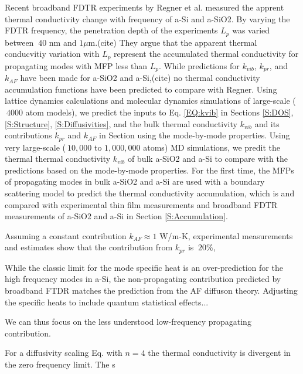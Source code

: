 \documentclass[aps,prb,twocolumn,superscriptaddress,footinbib,amsmath,amssymb,floatfix]{revtex4}
\begin{document}
Recent broadband FDTR experiments by Regner et al. measured  
the apprent thermal conductivity change with frequency of a-Si and 
a-SiO2. By varying the FDTR frequency, 
the penetration depth of the experiments $L_p$ was varied 
between $~40$ nm and $1 \mu$m.(cite)  
They argue that the apparent 
thermal conducvitiy variation with $L_p$ represent the accumulated 
thermal conductivity for propagating modes with MFP less than 
$L_p$. While predictions for $k_{vib}$, $k_{pr}$, and $k_{AF}$ have 
been made for a-SiO2 and a-Si,(cite) no thermal conductivity 
accumulation functions have been predicted to compare with Regner. 
Using lattice dynamics calculations and molecular dynamics simulations 
of large-scale ($~4000$ atom models), 
we predict the inputs to Eq. \eqref{EQ:kvib} in Sections \ref{S:DOS}, 
\ref{S:Structure}, \ref{S:Diffusivities}, and the bulk thermal 
conductivity 
$k_{vib}$ and its contributions $k_{pr}$ and $k_{AF}$ in Section 
using the mode-by-mode properties. 
Using very large-scale ($~10,000$ to $1,000,000$ atoms) 
MD simulations, we predit the thermal 
thermal conductivity $k_{vib}$ of bulk a-SiO2 and a-Si to compare with 
the predictions based on the mode-by-mode properties. 
For the first time, the MFPs of propagating modes in bulk 
a-SiO2 and a-Si are used with a boundary scattering model 
to predict the thermal conductivity accumulation, which is and 
compared with experimental thin film measurements and broadband 
FDTR measurements of a-SiO2 and a-Si in Section \ref{S:Accumulation}.



Assuming a constant contribution  
$k_{AF} \approx 1$ W/m-K, experimental 
measurements and estimates show that the contribution from 
$k_{pr}$ is $~20\%$,


While the classic limit for the mode specific heat is 
an over-prediction for the high frequency modes in a-Si, 
the non-propagating contribution 
predicted by broadband FTDR matches the prediction from the AF 
diffuson theory. Adjusting the specific heats to include quantum 
statistical effects...

We can thus focus on the less understood low-frequency propagating contribution. 


For a diffusivity scaling Eq. with $n=4$ the thermal conductivity 
is divergent in the zero frequency limit. The s
\end{document}
